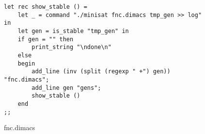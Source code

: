 \documentclass[10pt]{beamer}
\begin{document}
\begin{frame}[fragile]
\lstset{basicstyle=\footnotesize}
\begin{figure}
\caption{fnc.dimacs}
\begin{lstlisting}
let rec show_stable () =
    let _ = command "./minisat fnc.dimacs tmp_gen >> log" in
    let gen = is_stable "tmp_gen" in
    if gen = "" then
        print_string "\ndone\n"
    else
    begin
        add_line (inv (split (regexp " +") gen)) "fnc.dimacs";
        add_line gen "gens";
        show_stable ()
    end
;;
\end{lstlisting}
\end{figure}
\end{frame}

\end{document}
